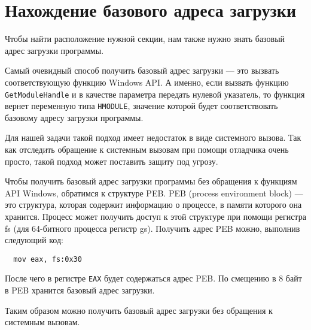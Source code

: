 
\section{Нахождение базового адреса загрузки}

Чтобы найти расположение нужной секции, нам также нужно знать базовый адрес
загрузки программы.

Самый очевидный способ получить базовый адрес загрузки --- это вызвать
соответствующую функцию Windows API. А именно, если вызвать функцию
\verb!GetModuleHandle! и в качестве параметра передать нулевой указатель, то
функция вернет переменную типа \verb!HMODULE!, значение которой будет
соответствовать базовому адресу загрузки программы.

Для нашей задачи такой подход имеет недостаток в виде системного вызова. Так как
отследить обращение к системным вызовам при помощи отладчика очень просто, такой
подход может поставить защиту под угрозу.

Чтобы получить базовый адрес загрузки программы без обращения к функциям API
Windows, обратимся к структуре PEB. PEB (process environment block) --- это
структура, которая содержит информацию о процессе, в памяти которого она
хранится. Процесс может получить доступ к этой структуре при помощи регистра fs
(для 64-битного процесса регистр gs). Получить адрес PEB можно, выполнив
следующий код:
\begin{verbatim}
  mov eax, fs:0x30
\end{verbatim}
После чего в регистре \verb!EAX! будет содержаться адрес PEB. По смещению в 8
байт в PEB хранится базовый адрес загрузки.

Таким образом можно получить базовый адрес загрузки без обращения к системным
вызовам.
